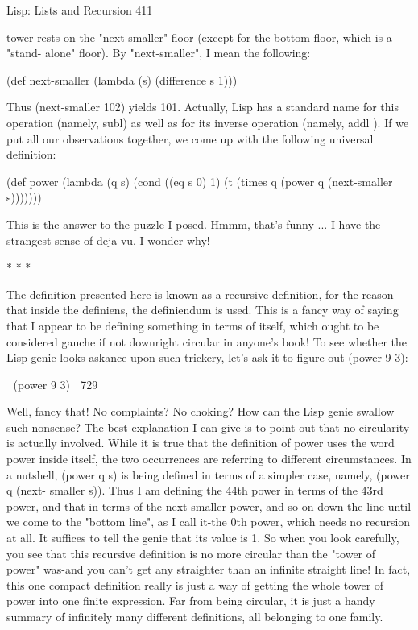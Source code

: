 Lisp: Lists and Recursion                                                           411

tower rests on the "next-smaller" floor (except for the bottom floor, which is a "stand-
alone" floor). By "next-smaller", I mean the following:

(def next-smaller (lambda (s) (difference s 1)))

Thus (next-smaller 102) yields 101. Actually, Lisp has a standard name for this
operation (namely, subl) as well as for its inverse operation (namely, addl ). If we put
all our observations together, we come up with the following universal definition:

(def power (lambda (q s)
       (cond ((eq s 0) 1)
              (t (times q (power q (next-smaller s)))))))

This is the answer to the puzzle I posed. Hmmm, that's funny ... I have the strangest
sense of deja vu. I wonder why!

                                        *   *   *

    The definition presented here is known as a recursive definition, for the reason
that inside the definiens, the definiendum is used. This is a fancy way of saying that I
appear to be defining something in terms of itself, which ought to be considered
gauche if not downright circular in anyone's book! To see whether the Lisp genie
looks askance upon such trickery, let's ask it to figure out (power 9 3):

    (power 9 3)
    729
   


Well, fancy that! No complaints? No choking? How can the Lisp genie swallow such
nonsense?
         The best explanation I can give is to point out that no circularity is actually
involved. While it is true that the definition of power uses the word power inside
itself, the two occurrences are referring to different circumstances. In a nutshell,
(power q s) is being defined in terms of a simpler case, namely, (power q (next-
smaller s)). Thus I am defining the 44th power in terms of the 43rd power, and that in
terms of the next-smaller power, and so on down the line until we come to the
"bottom line", as I call it-the 0th power, which needs no recursion at all. It suffices to
tell the genie that its value is 1. So when you look carefully, you see that this
recursive definition is no more circular than the "tower of power" was-and you can't
get any straighter than an infinite straight line! In fact, this one compact definition
really is just a way of getting the whole tower of power into one finite expression. Far
from being circular, it is just a handy summary of infinitely many different
definitions, all belonging to one family.




